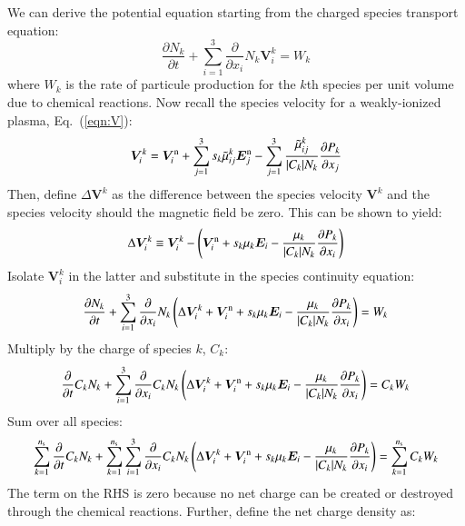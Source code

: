 \documentclass{warpdoc}
\newcommand{\ns}{{n_{\rm s}}}
\newcommand{\nd}{3}
\renewcommand{\vec}[1]{\bm{#1}}
\begin{document}
We can derive the potential equation starting from the charged species transport equation:
%
\begin{equation}
  \frac{\partial N_k}{\partial t} + \sum_{i=1}^3 \frac{\partial}{\partial x_i} N_k \vec{V}_i^k = W_k
\end{equation}
%
where $W_k$ is the rate of particule production for the $k$th species per unit volume due to chemical reactions. Now recall the species velocity for a weakly-ionized plasma, Eq.\ (\ref{eqn:V}):
%
\begin{equation}
  \vec{V}^{k}_i = \vec{V}^{\rm n}_i+\sum_{j=1}^\nd s_k \wtilde{\mu}^k_{ij}  \vec{E}_j^{\rm n}
             - \sum_{j=1}^\nd  \frac{\wtilde{\mu}^{k}_{ij}}{|C_k| N_k} \frac{\partial P_k}{\partial x_j}
\end{equation}
%
Then, define $\Delta \vec{V}^k$ as the difference between the species velocity $\vec{V}^k$ and the species velocity should the magnetic field be zero. This can be shown to yield:
%
\begin{equation}
\Delta \vec{V}^k_i \equiv \vec{V}^k_i - \left(\vec{V}^{\rm n}_i+ s_k \mu_k  \vec{E}_i
             -   \frac{\mu_k}{|C_k| N_k} \frac{\partial P_k}{\partial x_i}\right)
\label{eqn:deltaV}
\end{equation}
%
Isolate $\vec{V}_i^k$ in the latter and substitute in the species continuity equation:
%
\begin{equation}
  \frac{\partial N_k}{\partial t} + \sum_{i=1}^3 \frac{\partial}{\partial x_i} N_k \left(\Delta \vec{V}^k_i+\vec{V}^{\rm n}_i+ s_k \mu_k  \vec{E}_i  -   \frac{\mu_k}{|C_k| N_k} \frac{\partial P_k}{\partial x_i} \right) = W_k
\end{equation}
%
Multiply by the charge of species $k$, $C_k$:
%
\begin{equation}
  \frac{\partial }{\partial t}C_k N_k + \sum_{i=1}^3 \frac{\partial}{\partial x_i} C_k N_k \left(\Delta \vec{V}^k_i+\vec{V}^{\rm n}_i+ s_k \mu_k  \vec{E}_i  -   \frac{\mu_k}{|C_k| N_k} \frac{\partial P_k}{\partial x_i} \right) = C_k W_k
\end{equation}
%
Sum over all species:
%
\begin{equation}
 \sum_{k=1}^\ns \frac{\partial }{\partial t}C_k N_k + \sum_{k=1}^\ns\sum_{i=1}^3 \frac{\partial}{\partial x_i} C_k N_k \left(\Delta \vec{V}^k_i+\vec{V}^{\rm n}_i+ s_k \mu_k  \vec{E}_i  -   \frac{\mu_k}{|C_k| N_k} \frac{\partial P_k}{\partial x_i} \right) = \sum_{k=1}^\ns C_k W_k
\end{equation}
%
The term on the RHS is zero because no net charge can be created or destroyed through the chemical reactions. Further, define the net charge density as:
\end{document}

